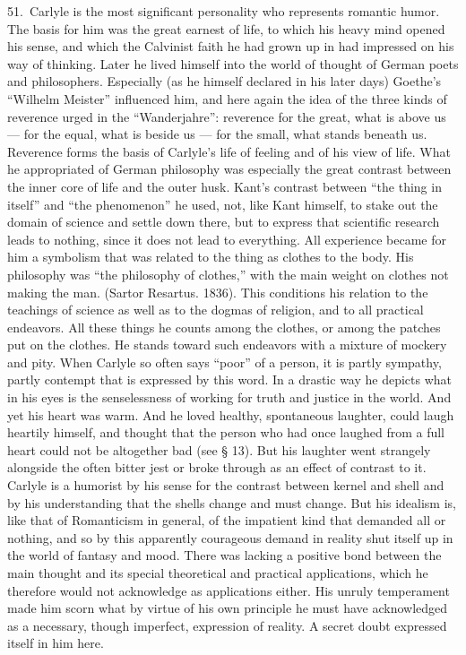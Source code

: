 \documentclass[12pt]{book}
\newcommand{\opage}[1]{\marginnote{\footnotesize\textit{[#1]}}}
\begin{document}
51.~Carlyle is the most significant personality who represents romantic humor. The basis for him
was the great earnest of life, to which his heavy mind opened his sense, and which the Calvinist
faith he had grown up in had impressed on his way of thinking. Later he lived himself into the
world of thought of German poets and philosophers. Especially (as he himself declared in his later
days) Goethe's ``Wilhelm Meister'' influenced him, and here again the idea of the three kinds of
reverence urged in the ``Wanderjahre'': reverence for the great, what is above us --- for the
equal, what is beside us --- for the small, what stands beneath us. Reverence forms the basis of
Carlyle's life of feeling and of his view of life. What he appropriated of German philosophy was
especially the great contrast between the inner core of life and the outer husk. Kant's contrast
between ``the thing in itself'' and ``the phenomenon'' he used, not, like Kant himself, to stake
out the domain of science and settle down there, but to express that scientific research leads to
nothing, since it does not lead to everything. All experience became for him a symbolism that was
related to the thing as clothes to the body. His philosophy was ``the philosophy of clothes,'' with
the main weight on clothes not making the man. (Sartor Resartus. 1836). This conditions his
\opage{166}relation to the teachings of science as well as to the dogmas of religion, and to all
practical endeavors. All these things he counts among the clothes, or among the patches put on the
clothes. He stands toward such endeavors with a mixture of mockery and pity. When Carlyle so often
says ``poor'' of a person, it is partly sympathy, partly contempt that is expressed by this word. In
a drastic way he depicts what in his eyes is the senselessness of working for truth and justice in
the world. And yet his heart was warm. And he loved healthy, spontaneous laughter, could laugh
heartily himself, and thought that the person who had once laughed from a full heart could not be
altogether bad (see § 13). But his laughter went strangely alongside the often bitter jest or broke
through as an effect of contrast to it. Carlyle is a humorist by his sense for the contrast between
kernel and shell and by his understanding that the shells change and must change. But his idealism
is, like that of Romanticism in general, of the impatient kind that demanded all or nothing, and so
by this apparently courageous demand in reality shut itself up in the world of fantasy and mood.
There was lacking a positive bond between the main thought and its special theoretical and practical
applications, which he therefore would not acknowledge as applications either. His unruly
temperament made him scorn what by virtue of his own principle he must have acknowledged as a
necessary, though imperfect, expression of reality. A secret doubt expressed itself in him here.
\end{document}
